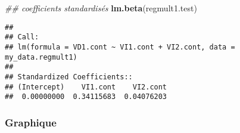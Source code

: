 \documentclass[
]{book}
\newenvironment{Shaded}{\begin{snugshade}}{\end{snugshade}}
\newcommand{\CommentTok}[1]{\textcolor[rgb]{0.56,0.35,0.01}{\textit{#1}}}
\newcommand{\KeywordTok}[1]{\textcolor[rgb]{0.13,0.29,0.53}{\textbf{#1}}}
\newcommand{\NormalTok}[1]{#1}
\begin{document}
\begin{Shaded}
\begin{Highlighting}[]
\CommentTok{## coefficients standardisés}
\KeywordTok{lm.beta}\NormalTok{(regmult1.test)}
\end{Highlighting}
\end{Shaded}

\begin{verbatim}
## 
## Call:
## lm(formula = VD1.cont ~ VI1.cont + VI2.cont, data = my_data.regmult1)
## 
## Standardized Coefficients::
## (Intercept)    VI1.cont    VI2.cont 
##  0.00000000  0.34115683  0.04076203
\end{verbatim}

\hypertarget{graphique-4}{%
\subsubsection{Graphique}\label{graphique-4}}
\end{document}
